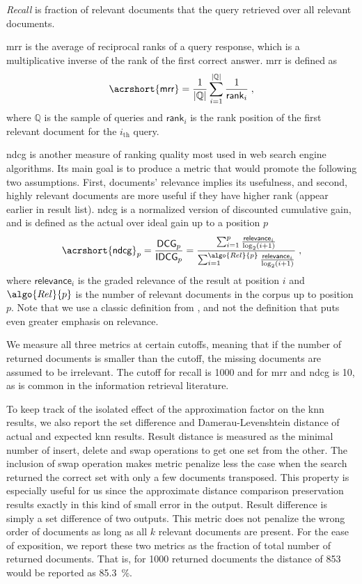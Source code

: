 				\emph{Recall} is fraction of relevant documents that the query retrieved over all relevant documents.

				\acrfull{mrr} is the average of reciprocal ranks of a query response, which is a multiplicative inverse of the rank of the first correct answer.
				\acrshort{mrr} is defined as
				\[
					\mathsf{\acrshort{mrr}} = \frac{1}{| \mathbb{Q} |} \sum_{i = 1}^{| \mathbb{Q} |} \frac{1}{\mathsf{rank}_i} \; ,
				\]
				where $\mathbb{Q}$ is the sample of queries and $\mathsf{rank}_i$ is the rank position of the first relevant document for the $i_\text{th}$ query.

				\acrfull{ndcg} is another measure of ranking quality most used in web search engine algorithms.
				Its main goal is to produce a metric that would promote the following two assumptions.
				First, documents' relevance implies its usefulness, and second, highly relevant documents are more useful if they have higher rank (appear earlier in result list).
				\acrshort{ndcg} is a normalized version of discounted cumulative gain, and is defined as the actual over ideal gain up to a position $p$
				\[
					\mathsf{\acrshort{ndcg}}_p = \frac{\mathsf{DCG}_p}{\mathsf{IDCG}_p} = \frac{ \sum_{i=1}^p \frac{ \mathsf{relevance}_i }{ \log_2 (i + 1) } }{ \sum_{i=1}^{ \algo{Rel}{p} } \frac{ \mathsf{relevance}_i }{ \log_2 (i + 1) } } \; ,
				\]
				where $\mathsf{relevance}_i$ is the graded relevance of the result at position $i$ and $\algo{Rel}{p}$ is the number of relevant documents in the corpus up to position $p$.
				Note that we use a classic definition from \cite{dcg}, and not the \cite{dcg-updated} definition that puts even greater emphasis on relevance.

				We measure all three metrics at certain cutoffs, meaning that if the number of returned documents is smaller than the cutoff, the missing documents are assumed to be irrelevant.
				The cutoff for recall is \num{1000} and for \acrshort{mrr} and \acrshort{ndcg} is 10, as is common in the information retrieval literature.

				To keep track of the isolated effect of the approximation factor on the \acrshort{knn} results, we also report the set difference and Damerau-Levenshtein distance \cite{levenshtein-distance,damerau-distance} of actual and expected \acrshort{knn} results.
				Result distance is measured as the minimal number of insert, delete and swap operations to get one set from the other.
				The inclusion of swap operation makes metric penalize less the case when the search returned the correct set with only a few documents transposed.
				This property is especially useful for us since the approximate distance comparison preservation results exactly in this kind of small error in the output.
				Result difference is simply a set difference of two outputs.
				This metric does not penalize the wrong order of documents as long as all $k$ relevant documents are present.
				For the ease of exposition, we report these two metrics as the fraction of total number of returned documents.
				That is, for \num{1000} returned documents the distance of \num{853} would be reported as \SI{85.3}{\percent}.

